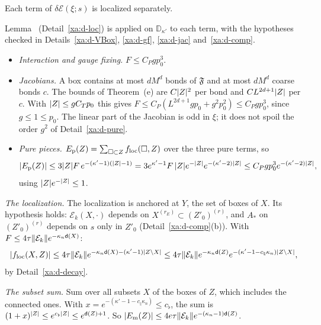 \begin{detail}\label{xa:d-locpieces}
Each term of $\delta\mathcal E(\xi;s)$ is localized separately.
\begin{step}
Lemma~ (Detail~\ref{xa:d-loc}) is applied on $\mathbb D_{\kappa'}$ to each term, with the hypotheses checked in Details~\ref{xa:d-VBox}, \ref{xa:d-gf}, \ref{xa:d-jac} and~\ref{xa:d-comp}.
\begin{itemize}
\item \emph{Interaction and gauge fixing.} $F\le C_Pgp_0^3$.
\item \emph{Jacobians.} A box contains at most $dM^d$ bonds of $\mathfrak F$ and at most $dM^d$ coarse bonds $c$. The bounds of Theorem~(e) are $C\lvert Z\rvert^2$ per bond and $CL^{2d+1}\lvert Z\rvert$ per $c$. With $\lvert Z\rvert\le gC_Tp_0$ this gives $F\le C_P(L^{2d+1}gp_0+g^2p_0^2)\le C_Pgp_0^3$, since $g\le1\le p_0$. The linear part of the Jacobian is odd in $\xi$; it does not spoil the order $g^2$ of Detail~\ref{xa:d-pure}.
\item \emph{Pure pieces.} $E_{\rm p}(Z)=\sum_{\Box\subset Z}f_{\rm loc}(\Box,Z)$ over the three pure terms, so
\[
\lvert E_{\rm p}(Z)\rvert\le3\lvert Z\rvert F\,e^{-(\kappa'-1)(\lvert Z\rvert-1)}=3e^{\kappa'-1}F\,\lvert Z\rvert e^{-\lvert Z\rvert}e^{-(\kappa'-2)\lvert Z\rvert}\le C_Pgp_0^3e^{-(\kappa'-2)\lvert Z\rvert},
\]
using $\lvert Z\rvert e^{-\lvert Z\rvert}\le1$.
\end{itemize}
\end{step}

\begin{step}
\emph{The localization.} The localization is anchored at $Y$, the set of boxes of $X$. Its hypothesis holds: $\mathcal E_k(X,\cdot)$ depends on $X^{(r_E)}\subset(Z'_0)^{(r)}$, and $A_*$ on $(Z'_0)^{(r)}$ depends on $s$ only in $Z'_0$ (Detail~\ref{xa:d-comp}(b)). With $F\le4\tau\lVert\mathcal E_k\rVert e^{-\kappa_n\mathsf d(X)}$:
\[
\lvert f_{\rm loc}(X,Z)\rvert\le4\tau\lVert\mathcal E_k\rVert e^{-\kappa_n\mathsf d(X)-(\kappa'-1)\lvert Z\setminus X\rvert}\le4\tau\lVert\mathcal E_k\rVert e^{-\kappa_n\mathsf d(Z)}e^{-(\kappa'-1-c_\natural\kappa_n)\lvert Z\setminus X\rvert},
\]
by Detail~\ref{xa:d-decay}.

\emph{The subset sum.} Sum over all subsets $X$ of the boxes of $Z$, which includes the connected ones. With $x=e^{-(\kappa'-1-c_\natural\kappa_n)}\le c_\flat$, the sum is $(1+x)^{\lvert Z\rvert}\le e^{c_\flat\lvert Z\rvert}\le e^{\mathsf d(Z)+1}$. So $\lvert E_{\rm m}(Z)\rvert\le4e\tau\lVert\mathcal E_k\rVert e^{-(\kappa_n-1)\mathsf d(Z)}$.
\end{step}


\end{detail}
